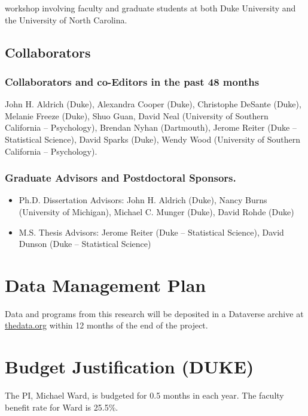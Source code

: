 \documentclass[pdftex,12pt,fullpage,oneside]{amsart}
\begin{document}
workshop involving faculty and graduate students at both Duke
University and the University of North Carolina.  

\subsection*{Collaborators}

\subsubsection*{Collaborators and co-Editors in the past 48 months}
John H. Aldrich (Duke), Alexandra Cooper (Duke), Christophe DeSante
(Duke), Melanie Freeze (Duke), Shuo Guan, David Neal (University of Southern
California -- Psychology), Brendan Nyhan (Dartmouth), Jerome Reiter
(Duke -- Statistical Science), David Sparks (Duke), Wendy Wood
(University of Southern California -- Psychology).

\subsubsection*{Graduate Advisors and Postdoctoral Sponsors.}
\begin{itemize}
\item[] Ph.D. Dissertation Advisors: John H. Aldrich (Duke), Nancy Burns
  (University of Michigan), Michael C. Munger (Duke), David Rohde (Duke)
\item[] M.S. Thesis Advisors: Jerome Reiter (Duke -- Statistical Science), David Dunson
  (Duke -- Statistical Science)
\end{itemize}

\newpage
\setcounter{page}{1}
\thispagestyle{empty}

\section*{Data Management Plan}

\noindent Data and programs from this research will be deposited in a Dataverse archive at \url{thedata.org} within 12 months of the end of the project.

\newpage
\setcounter{page}{1}
\thispagestyle{empty}


\section*{Budget Justification (DUKE)}

The PI, Michael Ward, is budgeted for 0.5 months in each year.  The
faculty benefit rate for Ward is 25.5\%.
\end{document}
